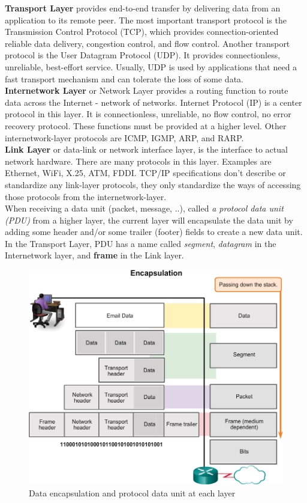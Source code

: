 \documentclass[a4paper, 11pt]{article}
\begin{document}
\textbf{Transport Layer} provides end-to-end transfer by delivering data from an application to its remote peer. The most important transport protocol is the Transmission Control Protocol (TCP), which provides connection-oriented reliable data delivery, congestion control, and flow control. Another transport protocol is the User Datagram Protocol (UDP). It provides connectionless, unreliable, best-effort service. Usually, UDP is used by applications that need a fast transport mechanism and can tolerate the loss of some data.\\

\textbf{Internetwork Layer} or Network Layer provides a routing function to route data across the Internet - network of networks. Internet Protocol (IP) is a center protocol in this layer. It is connectionless, unreliable, no flow control, no error recovery protocol. These functions must be provided at a higher level. Other internetwork-layer protocols are ICMP, IGMP, ARP, and RARP.\\

\textbf{Link Layer} or data-link or network interface layer, is the interface to actual network hardware. There are many protocols in this layer. Examples are Ethernet, WiFi, X.25, ATM, FDDI. TCP/IP specifications don't describe or standardize any link-layer protocols, they only standardize the ways of accessing those protocols from the internetwork-layer.\\

When receiving a data unit (packet, message, ..), called \textit{a protocol data unit (PDU)} from a higher layer, the current layer will encapsulate the data unit by adding some header and/or some trailer (footer) fields to create a new data unit. In the Transport Layer, PDU has a name called \textit{segment}, \textit{datagram} in the Internetwork layer, and \textbf{frame} in the Link layer.

\begin{figure}[h]
\includegraphics[scale=0.5]{protocol-data-unit.png}
\caption{Data encapsulation and protocol data unit at each layer}
\end{figure}
\end{document}
